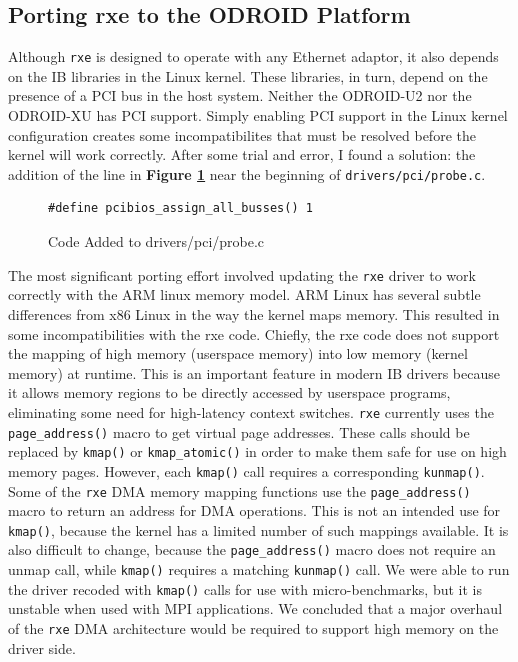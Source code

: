 \documentclass[11pt]{book}
\begin{document}
\subsection{\textbf{Porting rxe to the ODROID Platform}}

Although \verb;rxe; is designed to operate with any Ethernet adaptor, it also
depends on the IB libraries in the Linux kernel. These libraries, in turn,
depend on the presence of a PCI bus in the host system. Neither the ODROID-U2
nor the ODROID-XU has PCI support. Simply enabling PCI support in the Linux
kernel configuration creates some incompatibilites that must be resolved before
the kernel will work correctly. After some trial and error, I found a solution:
the addition of the line in \textbf{Figure \ref{pci_code}} near the beginning of
\verb;drivers/pci/probe.c;.

\begin{figure}[h]
\centering
\begin{verbatim}
#define pcibios_assign_all_busses() 1
\end{verbatim}
\caption{Code Added to drivers/pci/probe.c}
\label{pci_code}
\end{figure}

The most significant porting effort involved updating the \verb;rxe; driver to
work correctly with the ARM linux memory model. ARM Linux has several subtle
differences from x86 Linux in the way the kernel maps memory. This resulted in
some incompatibilities with the rxe code. Chiefly, the rxe code does not support
the mapping of high memory (userspace memory) into low memory (kernel memory) at
runtime. This is an important feature in modern IB drivers because it allows
memory regions to be directly accessed by userspace programs, eliminating some
need for high-latency context switches. \verb;rxe; currently uses the
\verb;page_address(); macro to get virtual page addresses. These calls should be
replaced by \verb;kmap(); or \verb;kmap_atomic(); in order to make them safe for
use on high memory pages. However, each \verb;kmap(); call requires a
corresponding \verb;kunmap();. Some of the \verb;rxe; DMA memory mapping
functions use the \verb;page_address(); macro to return an address for DMA
operations. This is not an intended use for \verb;kmap();, because the kernel
has a limited number of such mappings available. It is also difficult to change,
because the \verb;page_address(); macro does not require an unmap call, while
\verb;kmap(); requires a matching \verb;kunmap(); call. We were able to run the
driver recoded with \verb;kmap(); calls for use with micro-benchmarks, but it is
unstable when used with MPI applications. We concluded that a major overhaul of
the \verb;rxe; DMA architecture would be required to support high memory on the
driver side.
\end{document}
